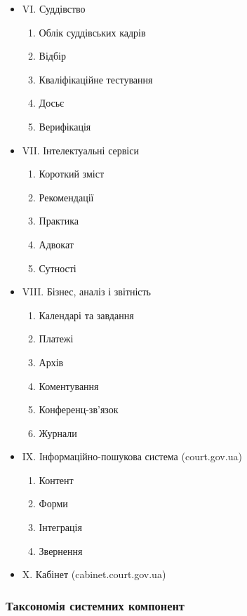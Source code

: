 \documentclass{article}
\begin{document}
\begin{itemize}
\begin{enumerate}
\item Справи
\item Провадження
\item Судові засідання і їх рішення
\item Авторозподіл справ
\item Реєстрово-інтеграційні сервіси
\end{enumerate}
\item VI. Суддівство
\begin{enumerate}
\item Облік суддівських кадрів
\item Відбір
\item Кваліфікаційне тестування
\item Досьє
\item Верифікація
\end{enumerate}
\newpage
\item VII. Інтелектуальні сервіси
\begin{enumerate}
\item Короткий зміст
\item Рекомендації
\item Практика
\item Адвокат
\item Сутності
\end{enumerate}
\item VIII. Бізнес, аналіз і звітність
\begin{enumerate}
\item Календарі та завдання
\item Платежі
\item Архів
\item Коментування
\item Конференц-зв'язок
\item Журнали
\end{enumerate}
\item IX. Інформаційно-пошукова система (court.gov.ua)
\begin{enumerate}
\item Контент
\item Форми
\item Інтеграція
\item Звернення
\end{enumerate}
\item X. Кабінет (cabinet.court.gov.ua)
\end{itemize}

\newpage
\subsubsection{Таксономія системних компонент}
\end{document}
